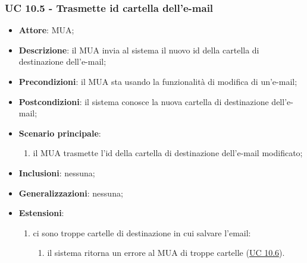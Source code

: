     \subsubsection{UC 10.5 - Trasmette id cartella dell'e-mail} \label{sec:UC10.5}
    \begin{itemize}
        \item \textbf{Attore}: MUA;
        \item \textbf{Descrizione}: il MUA invia al sistema il nuovo id della cartella di destinazione dell'e-mail;
        \item \textbf{Precondizioni}: il MUA sta usando la funzionalità di modifica di un'e-mail;
        \item \textbf{Postcondizioni}: il sistema conosce la nuova cartella di destinazione dell'e-mail;
        \item \textbf{Scenario principale}:
            \begin{enumerate}
                \item il MUA trasmette l'id della cartella di destinazione dell'e-mail modificato;
            \end{enumerate}
        \item \textbf{Inclusioni}: nessuna;
        \item \textbf{Generalizzazioni}: nessuna;
        \item \textbf{Estensioni}:             
        \begin{enumerate}[label=\alph*.]
            \item ci sono troppe cartelle di destinazione in cui salvare l'email:
            \begin{enumerate}[label=\arabic*.]
                \item il sistema ritorna un errore al MUA di troppe cartelle (\hyperref[sec:UC10.6]{UC 10.6}).
            \end{enumerate}
        \end{enumerate}
    \end{itemize}

